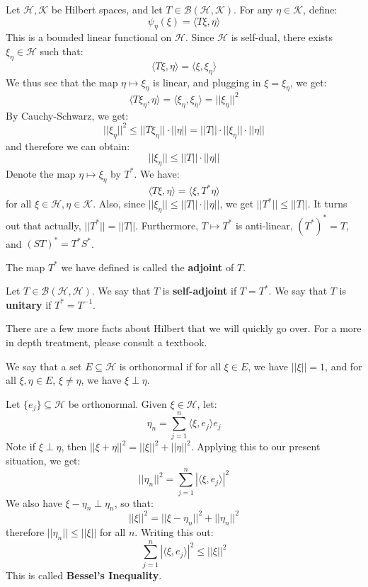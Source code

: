 \documentclass[a4paper,12pt]{report}
\newcommand{\ms}[1]{\mathscr{#1}}
\newcommand{\sse} {\subseteq}
\newenvironment{definition}[1][Definition.]{\begin{trivlist}
\item[\hskip \labelsep {\bfseries #1}]}{\end{trivlist}}
\begin{document}
	Let $\ms{H}, \ms{K}$ be Hilbert spaces, and let $T \in \ms{B}(\ms{H}, \ms{K})$. For any $\eta \in \ms{K}$, define:
	\[ \psi_\eta(\xi) = \langle T\xi, \eta \rangle \]
	This is a bounded linear functional on $\ms{H}$. Since $\ms{H}$ is self-dual, there exists $\xi_\eta \in \ms{H}$ such that:
	\[ \langle T\xi, \eta \rangle = \langle \xi, \xi_\eta \rangle \]
	We thus see that the map  $\eta \mapsto \xi_\eta$ is linear, and plugging in $\xi = \xi_\eta$, we get:
	\[ \langle T \xi_\eta, \eta \rangle = \langle \xi_\eta, \xi_\eta \rangle = ||\xi_\eta||^2 \]
	By Cauchy-Schwarz, we get:
	\[ ||\xi_\eta||^2 \leq ||T\xi_\eta|| \cdot ||\eta|| = ||T|| \cdot ||\xi_\eta|| \cdot ||\eta|| \]
	and therefore we can obtain:
	\[ ||\xi_\eta|| \leq ||T|| \cdot ||\eta|| \]
	Denote the map $\eta \mapsto \xi_\eta$ by $T^*$. We have:
	\[ \langle T\xi, \eta \rangle = \langle \xi, T^*\eta \rangle \]
	for all $\xi \in \ms{H}, \eta \in \ms{K}$. Also, since $||\xi_\eta|| \leq ||T|| \cdot ||\eta||$, we get $||T^*|| \leq ||T||$. It turns out that actually, $||T^*|| = ||T||$. Furthermore, $T \mapsto T^*$ is anti-linear, $(T^*)^* = T$, and $(ST)^* = T^*S^*$.
	
	\begin{definition}
	The map $T^*$ we have defined is called the \textbf{adjoint} of $T$.
	\end{definition}
	
	\begin{definition}
	Let $T \in \ms{B}(\ms{H}, \ms{H})$. We say that $T$ is \textbf{self-adjoint} if $T = T^*$. We say that $T$ is \textbf{unitary} if $T^* = T^{-1}$.
	\end{definition}
	
	\noindent There are a few more facts about Hilbert that we will quickly go over. For a more in depth treatment, please consult a textbook. 
	
	\begin{definition}
	We say that a set $E \sse \ms{H}$ is orthonormal if for all $\xi \in E$, we have $||\xi|| = 1$, and for all $\xi, \eta \in E$, $\xi \neq \eta$, we have $\xi \perp \eta$. 
	\end{definition}
	
	\noindent Let $\{e_j\} \sse \ms{H}$ be orthonormal. Given $\xi \in \ms{H}$, let:
	\[ \eta_n = \sum_{j=1}^n \langle \xi, e_j \rangle e_j \]
	Note if $\xi \perp \eta$, then $||\xi + \eta||^2 = ||\xi||^2 + ||\eta||^2$. Applying this to our present situation, we get:
	\[ ||\eta_n||^2 = \sum_{j=1}^n |\langle \xi, e_j \rangle |^2 \]
	We also have $\xi - \eta_n \perp \eta_n$, so that:
	\[ ||\xi||^2 = ||\xi - \eta_n||^2 + ||\eta_n||^2 \]
	therefore $||\eta_n|| \leq ||\xi||$ for all $n$. Writing this out:
	\[ \sum_{j=1}^n |\langle \xi, e_j \rangle|^2 \leq ||\xi||^2 \]
	This is called \textbf{Bessel's Inequality}.
	
\end{document}
